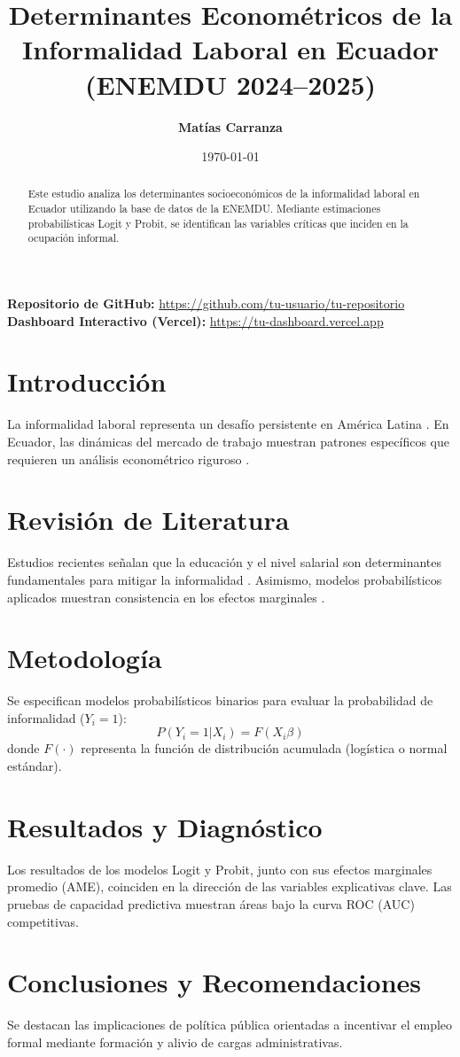 \documentclass[12pt]{article}
\title{\textbf{Determinantes Econométricos de la Informalidad Laboral en Ecuador (ENEMDU 2024--2025)}}
\author{\textbf{Matías Carranza}}
\date{\today}
\begin{document}
\maketitle

\begin{abstract}
Este estudio analiza los determinantes socioeconómicos de la informalidad laboral en Ecuador utilizando la base de datos de la ENEMDU. Mediante estimaciones probabilísticas Logit y Probit, se identifican las variables críticas que inciden en la ocupación informal.
\end{abstract}

\vspace{0.5cm}
\noindent\textbf{Repositorio de GitHub:} \url{https://github.com/tu-usuario/tu-repositorio} \\
\noindent\textbf{Dashboard Interactivo (Vercel):} \url{https://tu-dashboard.vercel.app}

\newpage

\section{Introducción}
La informalidad laboral representa un desafío persistente en América Latina \cite{cepal2022}. En Ecuador, las dinámicas del mercado de trabajo muestran patrones específicos que requieren un análisis econométrico riguroso \cite{inec2025}.

\section{Revisión de Literatura}
Estudios recientes señalan que la educación y el nivel salarial son determinantes fundamentales para mitigar la informalidad \cite{oit2023, worldbank2024}. Asimismo, modelos probabilísticos aplicados muestran consistencia en los efectos marginales \cite{gomez2026}.

\section{Metodología}
Se especifican modelos probabilísticos binarios para evaluar la probabilidad de informalidad ($Y_i = 1$):
\begin{equation}
    P(Y_i = 1 | X_i) = F(X_i \beta)
\end{equation}
donde $F(\cdot)$ representa la función de distribución acumulada (logística o normal estándar).

\section{Resultados y Diagnóstico}
Los resultados de los modelos Logit y Probit, junto con sus efectos marginales promedio (AME), coinciden en la dirección de las variables explicativas clave. Las pruebas de capacidad predictiva muestran áreas bajo la curva ROC (AUC) competitivas.

\section{Conclusiones y Recomendaciones}
Se destacan las implicaciones de política pública orientadas a incentivar el empleo formal mediante formación y alivio de cargas administrativas.



\end{document}
